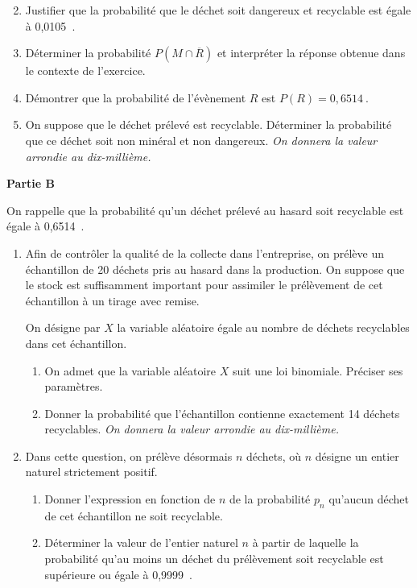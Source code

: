 \documentclass[10pt]{article}
\providecommand{\np}[2][]{{#2~#1}}
\begin{document}
\begin{enumerate}
\setcounter{enumi}{1}
\item Justifier que la probabilité que le déchet soit dangereux et recyclable est égale à \np{0,0105}.
\item Déterminer la probabilité $P\left(M \cap \overline{R}\right)$ et interpréter la réponse obtenue dans le contexte de l'exercice.
\item Démontrer que la probabilité de l'évènement $R$ est $P(R)=\np{0,6514}$.
\item On suppose que le déchet prélevé est recyclable. Déterminer la probabilité que ce déchet soit non minéral et non dangereux. \emph{On donnera la valeur arrondie au dix-millième.}
\end{enumerate}

\medskip

\textbf{Partie B}

\medskip

On rappelle que la probabilité qu'un déchet prélevé au hasard soit recyclable est égale à \np{0,6514}.

\begin{enumerate}
\item Afin de contrôler la qualité de la collecte dans l'entreprise, on prélève un échantillon de 20 déchets pris au hasard dans la production. On suppose que le stock est suffisamment important pour assimiler le prélèvement de cet échantillon à un tirage avec remise.

On désigne par $X$ la variable aléatoire égale au nombre de déchets recyclables dans cet échantillon.

	\begin{enumerate}
		\item On admet que la variable aléatoire $X$ suit une loi binomiale. Préciser ses paramètres.

		\item Donner la probabilité que l'échantillon contienne exactement 14 déchets recyclables. \emph{On donnera la valeur arrondie au dix-millième.}
	\end{enumerate}

\item Dans cette question, on prélève désormais $n$ déchets, où $n$ désigne un entier naturel strictement positif.

	\begin{enumerate}
		\item Donner l'expression en fonction de $n$ de la probabilité $p_{n}$ qu'aucun déchet de cet échantillon ne soit recyclable.
		\item Déterminer la valeur de l'entier naturel $n$ à partir de laquelle la probabilité qu'au moins un déchet du prélèvement soit recyclable est supérieure ou égale à \np{0,9999}.
	\end{enumerate}
\end{enumerate}

\bigskip
\end{document}
